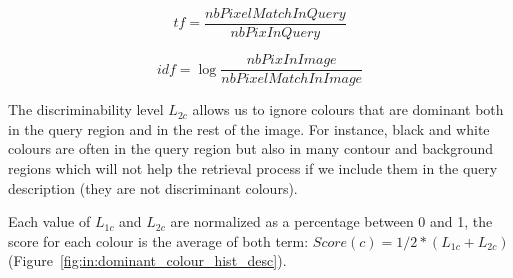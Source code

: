 


\begin{equation}
   tf = \frac{nbPixelMatchInQuery}{nbPixInQuery}
   \label{eq:query_colors_tf}  
  \end{equation}

\begin{equation}
 idf = \log \frac{nbPixInImage}{nbPixelMatchInImage}
   \label{eq:in:query_colors_idf}  
  \end{equation}

The discriminability level $L_{2c}$ allows us to ignore colours that are dominant both in the query region and in the rest of the image.
For instance, black and white colours are often in the query region but also in many contour and background regions which will not help the retrieval process if we include them in the query description (they are not discriminant colours).

Each value of $L_{1c}$ and $L_{2c}$ are normalized as a percentage between 0 and 1, the score for each colour is the average of both term: $Score(c) = 1/2 * (L_{1c} + L_{2c})$ (Figure~\ref{fig:in:dominant_colour_hist_desc}).




